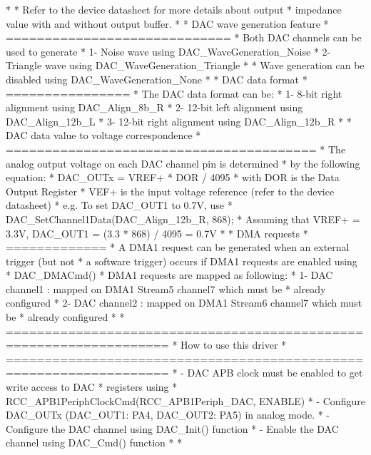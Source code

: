 \begin{DoxyVerb}
*          
*          Refer to the device datasheet for more details about output 
*          impedance value with and without output buffer.
*          
*          DAC wave generation feature
*          =============================      
*          Both DAC channels can be used to generate
*             1- Noise wave using DAC_WaveGeneration_Noise
*             2- Triangle wave using DAC_WaveGeneration_Triangle
*        
*          Wave generation can be disabled using DAC_WaveGeneration_None
*
*          DAC data format
*          ================   
*          The DAC data format can be:
*             1- 8-bit right alignment using DAC_Align_8b_R
*             2- 12-bit left alignment using DAC_Align_12b_L
*             3- 12-bit right alignment using DAC_Align_12b_R
*
*          DAC data value to voltage correspondence  
*          ========================================  
*          The analog output voltage on each DAC channel pin is determined
*          by the following equation: 
*          DAC_OUTx = VREF+ * DOR / 4095
*          with  DOR is the Data Output Register
*                VEF+ is the input voltage reference (refer to the device datasheet)
*          e.g. To set DAC_OUT1 to 0.7V, use
*            DAC_SetChannel1Data(DAC_Align_12b_R, 868);
*          Assuming that VREF+ = 3.3V, DAC_OUT1 = (3.3 * 868) / 4095 = 0.7V
*
*          DMA requests 
*          =============    
*          A DMA1 request can be generated when an external trigger (but not
*          a software trigger) occurs if DMA1 requests are enabled using
*          DAC_DMACmd()
*          DMA1 requests are mapped as following:
*             1- DAC channel1 : mapped on DMA1 Stream5 channel7 which must be 
*                               already configured
*             2- DAC channel2 : mapped on DMA1 Stream6 channel7 which must be 
*                               already configured
*
*          ===================================================================      
*                              How to use this driver 
*          ===================================================================          
*            - DAC APB clock must be enabled to get write access to DAC
*              registers using
*              RCC_APB1PeriphClockCmd(RCC_APB1Periph_DAC, ENABLE)
*            - Configure DAC_OUTx (DAC_OUT1: PA4, DAC_OUT2: PA5) in analog mode.
*            - Configure the DAC channel using DAC_Init() function
*            - Enable the DAC channel using DAC_Cmd() function
* 
*  \end{DoxyVerb}


